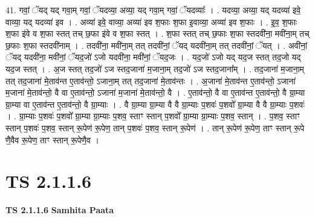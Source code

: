 \documentclass[17pt]{extarticle}
\begin{document}
41. गवां॒ ॅयद् यद् गवा॒म् गवां॒ ॅयदव्या॒ अव्या॒ यद् गवा॒म् गवां॒ ॅयदव्याः᳚ । . यदव्या॒ अव्या॒ यद् यदव्या॑ इवे॒ वाव्या॒ यद् यदव्या॑ इव । . अव्या॑ इवे॒ वाव्या॒ अव्या॑ इव श॒फाः श॒फा इ॒वाव्या॒ अव्या॑ इव श॒फाः । . इ॒व॒ श॒फाः श॒फा इ॑वे व श॒फा स्तत् तच् छ॒फा इ॑वे व श॒फा स्तत् । . श॒फा स्तत् तच् छ॒फाः श॒फा स्तदवी॑ना॒ मवी॑ना॒म् तच् छ॒फाः श॒फा स्तदवी॑नाम् । . तदवी॑ना॒ मवी॑ना॒म् तत् तदवी॑नां॒ ॅयद् यदवी॑ना॒म् तत् तदवी॑नां॒ ॅयत् । . अवी॑नां॒ ॅयद् यदवी॑ना॒ मवी॑नां॒ ॅयद॒जो॑ ऽजो यदवी॑ना॒ मवी॑नां॒ ॅयद॒जः । . यद॒जो॑ ऽजो यद् यद॒ज स्तत् तद॒जो यद् यद॒ज स्तत् । . अ॒ज स्तत् तद॒जो॑ ऽज स्तद॒जाना॑ म॒जाना॒म् तद॒जो॑ ऽज स्तद॒जाना᳚म् । . तद॒जाना॑ म॒जाना॒म् तत् तद॒जाना॑ मे॒ताव॑न्त ए॒ताव॑न्तो॒ ऽजाना॒म् तत् तद॒जाना॑ मे॒ताव॑न्तः । . अ॒जाना॑ मे॒ताव॑न्त ए॒ताव॑न्तो॒ ऽजाना॑ म॒जाना॑ मे॒ताव॑न्तो॒ वै वा ए॒ताव॑न्तो॒ ऽजाना॑ म॒जाना॑ मे॒ताव॑न्तो॒ वै । . ए॒ताव॑न्तो॒ वै वा ए॒ताव॑न्त ए॒ताव॑न्तो॒ वै ग्रा॒म्या ग्रा॒म्या वा ए॒ताव॑न्त ए॒ताव॑न्तो॒ वै ग्रा॒म्याः । . वै ग्रा॒म्या ग्रा॒म्या वै वै ग्रा॒म्याः प॒शवः॑ प॒शवो᳚ ग्रा॒म्या वै वै ग्रा॒म्याः प॒शवः॑ । . ग्रा॒म्याः प॒शवः॑ प॒शवो᳚ ग्रा॒म्या ग्रा॒म्याः प॒शव॒ स्ताꣳ स्तान् प॒शवो᳚ ग्रा॒म्या ग्रा॒म्याः प॒शव॒ स्तान् । . प॒शव॒ स्ताꣳ स्तान् प॒शवः॑ प॒शव॒ स्तान् रू॒पेण॑ रू॒पेण॒ तान् प॒शवः॑ प॒शव॒ स्तान् रू॒पेण॑ । . तान् रू॒पेण॑ रू॒पेण॒ ताꣳ स्तान् रू॒पे णै॒वैव रू॒पेण॒ ताꣳ स्तान् रू॒पेणै॒व । \newline
\pagebreak
{}

\section{ TS 2.1.1.6 }

\textbf{TS 2.1.1.6 } \newline
\textbf{Samhita Paata} \newline
\end{document}
